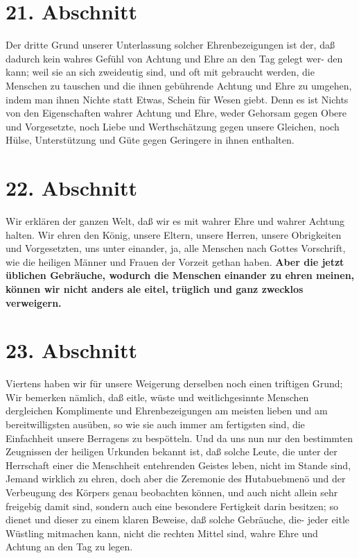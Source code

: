 \section{21. Abschnitt} \label{kap9_ab21}

Der dritte Grund unserer Unterlassung solcher Ehrenbezeigungen ist der, daß
dadurch kein wahres Gefühl von Achtung und Ehre an den Tag gelegt wer- den kann;
weil sie an sich zweideutig sind, und oft mit gebraucht werden, die Menschen zu
tauschen und die ihnen gebührende Achtung und Ehre zu umgehen, indem man ihnen
Nichte statt Etwas, Schein für Wesen giebt. Denn es ist Nichts von den
Eigenschaften wahrer Achtung und Ehre, weder Gehorsam gegen Obere und
Vorgesetzte, noch Liebe und Werthschätzung gegen unsere Gleichen, noch Hülse,
Unterstützung und Güte gegen Geringere in ihnen enthalten.

\section{22. Abschnitt} \label{kap9_ab22}

Wir erklären der ganzen Welt, daß wir es mit wahrer Ehre und wahrer Achtung
halten. Wir ehren den König, unsere Eltern, unsere Herren, unsere Obrigkeiten
und Vorgesetzten, uns unter einander, ja, alle Menschen nach Gottes Vorschrift,
wie die heiligen Männer und Frauen der Vorzeit gethan haben. \textbf{Aber die jetzt
üblichen Gebräuche, wodurch die Menschen einander zu ehren meinen, können wir
nicht anders ale eitel, trüglich und ganz zwecklos verweigern.}

\section{23. Abschnitt} \label{kap9_ab23}

Viertens haben wir für unsere Weigerung derselben noch einen triftigen Grund;
Wir bemerken nämlich, daß eitle, wüste und weitlichgesinnte Menschen dergleichen
Komplimente und Ehrenbezeigungen am meisten lieben und am bereitwilligsten
ausüben, so wie sie auch immer am fertigsten sind, die Einfachheit unsere
Berragens zu bespötteln. Und da uns nun nur den bestimmten Zeugnissen der
heiligen Urkunden bekannt ist, daß solche Leute, die unter der Herrschaft einer
die Menschheit entehrenden Geistes leben, nicht im Stande sind, Jemand wirklich
zu ehren, doch aber die Zeremonie des Hutabuebmenö und der Verbeugung des
Körpers genau beobachten können, und auch nicht allein sehr freigebig damit
sind, sondern auch eine besondere Fertigkeit darin besitzen; so dienet und
dieser zu einem klaren Beweise, daß solche Gebräuche, die- jeder eitle Wüstling
mitmachen kann, nicht die rechten Mittel sind, wahre Ehre und Achtung an den Tag
zu legen.

